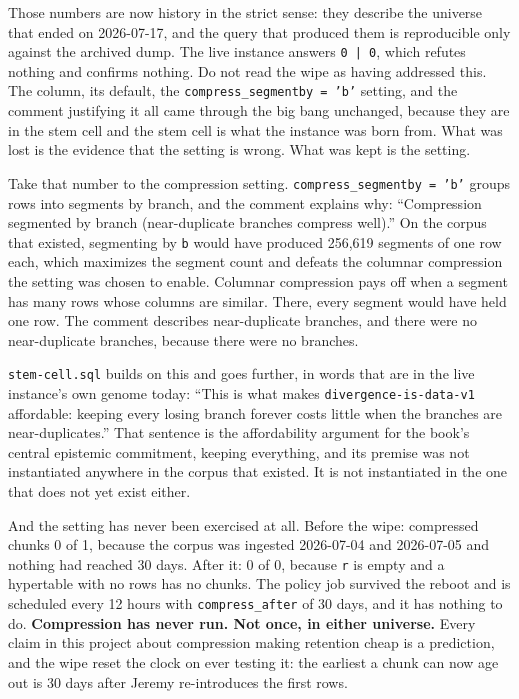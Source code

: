 Those numbers are now history in the strict sense: they describe the universe that ended on 2026-07-17, and the query that produced them is reproducible only against the archived dump. The live instance answers \texttt{0 | 0}, which refutes nothing and confirms nothing. Do not read the wipe as having addressed this. The column, its default, the \texttt{compress\_segmentby = 'b'} setting, and the comment justifying it all came through the big bang unchanged, because they are in the stem cell and the stem cell is what the instance was born from. What was lost is the evidence that the setting is wrong. What was kept is the setting.

Take that number to the compression setting. \texttt{compress\_segmentby = 'b'} groups rows into segments by branch, and the comment explains why: ``Compression segmented by branch (near-duplicate branches compress well).'' On the corpus that existed, segmenting by \texttt{b} would have produced 256,619 segments of one row each, which maximizes the segment count and defeats the columnar compression the setting was chosen to enable. Columnar compression pays off when a segment has many rows whose columns are similar. There, every segment would have held one row. The comment describes near-duplicate branches, and there were no near-duplicate branches, because there were no branches.

\texttt{stem-cell.sql} builds on this and goes further, in words that are in the live instance's own genome today: ``This is what makes \texttt{divergence-is-data-v1} affordable: keeping every losing branch forever costs little when the branches are near-duplicates.'' That sentence is the affordability argument for the book's central epistemic commitment, keeping everything, and its premise was not instantiated anywhere in the corpus that existed. It is not instantiated in the one that does not yet exist either.

And the setting has never been exercised at all. Before the wipe: compressed chunks 0 of 1, because the corpus was ingested 2026-07-04 and 2026-07-05 and nothing had reached 30 days. After it: 0 of 0, because \texttt{r} is empty and a hypertable with no rows has no chunks. The policy job survived the reboot and is scheduled every 12 hours with \texttt{compress\_after} of 30 days, and it has nothing to do. \textbf{Compression has never run. Not once, in either universe.} Every claim in this project about compression making retention cheap is a prediction, and the wipe reset the clock on ever testing it: the earliest a chunk can now age out is 30 days after Jeremy re-introduces the first rows.

